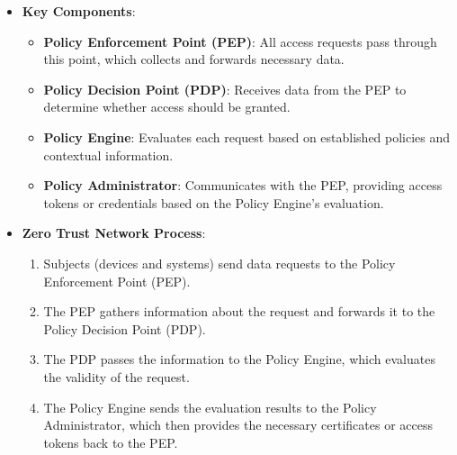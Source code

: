 \documentclass[11pt]{article}
\begin{document}
\begin{itemize}
\item \textbf{Key Components}:
\begin{itemize}
\item \textbf{\textbf{Policy Enforcement Point (PEP)}}: All access requests pass through this point, which collects and forwards necessary data.
\item \textbf{\textbf{Policy Decision Point (PDP)}}: Receives data from the PEP to determine whether access should be granted.
\item \textbf{\textbf{Policy Engine}}: Evaluates each request based on established policies and contextual information.
\item \textbf{\textbf{Policy Administrator}}: Communicates with the PEP, providing access tokens or credentials based on the Policy Engine’s evaluation.
\end{itemize}
\item \textbf{Zero Trust Network Process}:
\begin{enumerate}
\item Subjects (devices and systems) send data requests to the Policy Enforcement Point (PEP).
\item The PEP gathers information about the request and forwards it to the Policy Decision Point (PDP).
\item The PDP passes the information to the Policy Engine, which evaluates the validity of the request.
\item The Policy Engine sends the evaluation results to the Policy Administrator, which then provides the necessary certificates or access tokens back to the PEP.
\end{enumerate}
\end{itemize}
\end{document}
